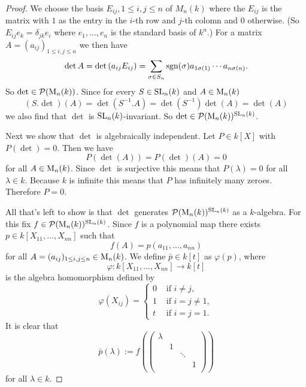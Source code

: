 \begin{proof}
 We choose the basis $E_{ij}, 1 \leq i,j \leq n$ of $M_n(k)$ where the $E_{ij}$ is the matrix with $1$ as the entry in the $i$-th row and $j$-th colomn and $0$ otherwise. (So $E_{ij} e_k = \delta_{jk}e_i$ where $e_1, \ldots, e_n$ is the standard basis of $k^n$.)  For a matrix $A = (a_{ij})_{1 \leq i,j \leq n}$ we then have
 \[
  \det A
  = \det\left( a_{ij} E_{ij}\right)
  = \sum_{\sigma \in S_n} \operatorname{sgn}(\sigma) a_{1 \sigma(1)} \cdots a_{n \sigma(n)}.
 \]
 So $\det \in \mathcal{P}(\operatorname{M}_n(k))$. Since for every $S \in \operatorname{SL}_n(k)$ and $A \in \operatorname{M}_n(k)$
 \[
  (S.\det)(A) = \det\left(S^{-1}.A\right) = \det\left(S^{-1}\right) \det(A) = \det(A)
 \]
 we also find that $\det$ is $\operatorname{SL}_n(k)$-invariant. So $\det \in \mathcal{P}(\operatorname{M}_n(k))^{\operatorname{SL}_n(k)}$.
 
 Next we show that $\det$ is algebraically independent. Let $P \in k[X]$ with $P(\det) = 0$. Then we have
 \[
  P(\det(A)) = P(\det)(A) = 0
 \]
 for all $A \in \operatorname{M}_n(k)$. Since $\det$ is surjective this means that $P(\lambda) = 0$ for all $\lambda \in k$. Because $k$ is infinite this means that $P$ has infinitely many zeroes. Therefore $P = 0$.
 
 All that’s left to show is that $\det$ generates $\mathcal{P}(\operatorname{M}_n(k))^{\operatorname{SL}_n(k)}$ as a $k$-algebra. For this fix $f \in \mathcal{P}(\operatorname{M}_n(k))^{\operatorname{SL}_n(k)}$. Since $f$ is a polynomial map there exists $p \in k[X_{11}, \ldots, X_{nn}]$ such that
 \[
  f(A) = p(a_{11}, \ldots, a_{nn})
 \]
 for all $A = (a_{ij})_{1 \leq i,j \leq n} \in \operatorname{M}_n(k)$. We define $\bar{p} \in k[t]$ as $\varphi(p)$, where
 \[
  \varphi : k[X_{11}, \ldots, X_{nn}] \to k[t]
 \] 
 is the algebra homomorphism defined by 
 \[
  \varphi(X_{ij}) =
  \begin{cases}
   0 & \text{ if } i \neq j, \\
   1 & \text{ if } i = j \neq 1, \\
   t & \text{ if } i = j = 1.
  \end{cases}
 \]
 It is clear that
 \[
  \bar{p}(\lambda) :=
  f\left(
   \begin{pmatrix}
    \lambda &   &        &   \\
            & 1 &        &   \\
            &   & \ddots &   \\
            &   &        & 1 \\
   \end{pmatrix}
  \right)
 \]
 for all $\lambda \in k$.
 

\end{proof}
